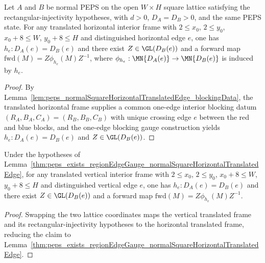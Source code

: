 \begin{lemma}%
    \label{thm:peps_exists_regionEdgeGauge_normalSquareHorizontalTranslatedEdge}
    \leanok
    Let $A$ and $B$ be normal PEPS on the open $W\times H$ square lattice satisfying the rectangular-injectivity hypotheses, with $d>0$, $D_A=D_B>0$, and the same PEPS state. For any translated horizontal interior frame with $2\le x_0$, $2\le y_0$, $x_0+8\le W$, $y_0+8\le H$ and distinguished horizontal edge $e$, one has $h_e:D_A(e)=D_B(e)$ and there exist $Z\in\GL(D_B(e))$ and a forward map $\mathrm{fwd}(M)=Z\phi_{h_e}(M)Z^{-1}$, where $\phi_{h_e}:\MN{D_A(e)}\to\MN{D_B(e)}$ is induced by $h_e$.
\end{lemma}
\begin{proof}\leanok
    By Lemma~\ref{lem:peps_normalSquareHorizontalTranslatedEdge_blockingData}, the translated horizontal frame supplies a common one-edge interior blocking datum $(R_A,B_A,C_A)=(R_B,B_B,C_B)$ with unique crossing edge $e$ between the red and blue blocks, and the one-edge blocking gauge construction yields $h_e:D_A(e)=D_B(e)$ and $Z\in\GL(D_B(e))$.
\end{proof}

\begin{lemma}%
    \label{thm:peps_exists_regionEdgeGauge_normalSquareVerticalTranslatedEdge}
    \leanok
    Under the hypotheses of Lemma~\ref{thm:peps_exists_regionEdgeGauge_normalSquareHorizontalTranslatedEdge}, for any translated vertical interior frame with $2\le x_0$, $2\le y_0$, $x_0+8\le W$, $y_0+8\le H$ and distinguished vertical edge $e$, one has $h_e:D_A(e)=D_B(e)$ and there exist $Z\in\GL(D_B(e))$ and a forward map $\mathrm{fwd}(M)=Z\phi_{h_e}(M)Z^{-1}$.
\end{lemma}
\begin{proof}
    \leanok
    Swapping the two lattice coordinates maps the vertical translated frame and its rectangular-injectivity hypotheses to the horizontal translated frame, reducing the claim to Lemma~\ref{thm:peps_exists_regionEdgeGauge_normalSquareHorizontalTranslatedEdge}.
\end{proof}

